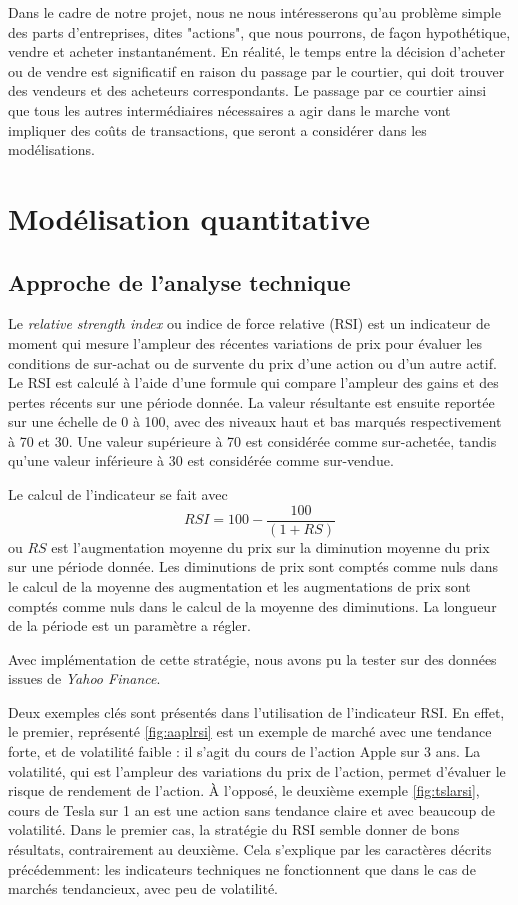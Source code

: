 \documentclass[twocolumn]{article}
\begin{document}
Dans le cadre de notre projet, nous ne nous intéresserons qu'au problème simple des parts d'entreprises, dites "actions", que nous pourrons, de façon hypothétique, vendre et acheter instantanément. En réalité, le temps entre la décision d'acheter ou de vendre est significatif en raison du passage par le courtier, qui doit trouver des vendeurs et des acheteurs correspondants. Le passage par ce courtier ainsi que tous les autres intermédiaires nécessaires a agir dans le marche vont impliquer des coûts de transactions, que seront a considérer dans les modélisations.

\section{Modélisation quantitative}

\subsection{Approche de l'analyse technique}

Le \textit{relative strength index} ou indice de force relative (RSI) est un indicateur de moment qui mesure l'ampleur des récentes variations de prix pour évaluer les conditions de sur-achat ou de survente du prix d'une action ou d'un autre actif. Le RSI est calculé à l'aide d'une formule qui compare l'ampleur des gains et des pertes récents sur une période donnée. La valeur résultante est ensuite reportée sur une échelle de 0 à 100, avec des niveaux haut et bas marqués respectivement à 70 et 30. Une valeur supérieure à 70 est considérée comme sur-achetée, tandis qu'une valeur inférieure à 30 est considérée comme sur-vendue.

Le calcul de l'indicateur se fait avec $$RSI = 100 - \frac{100}{(1 + RS)}$$
ou $RS$ est l'augmentation moyenne du prix sur la diminution moyenne du prix sur une période donnée. Les diminutions de prix sont compt\'es comme nuls dans le calcul de la moyenne des augmentation et les augmentations de prix sont compt\'es comme nuls dans le calcul de la moyenne des diminutions.
La longueur de la période est un paramètre a régler.

Avec implémentation de cette stratégie, nous avons pu la tester sur des données issues de \textit{Yahoo Finance}.

Deux exemples clés sont présentés dans l'utilisation de l'indicateur RSI. En effet, le premier, représenté \ref{fig:aaplrsi} est un exemple de marché avec une tendance forte, et de volatilité faible : il s'agit du cours de l'action Apple sur 3 ans. La volatilité, qui est l'ampleur des variations du prix de l'action, permet d'évaluer le risque de rendement de l'action. À l'opposé, le deuxième exemple \ref{fig:tslarsi}, cours de Tesla sur 1 an est une action sans tendance claire et avec beaucoup de volatilité. Dans le premier cas, la stratégie du RSI semble donner de bons résultats, contrairement au deuxième. Cela s'explique par les caractères décrits précédemment: les indicateurs techniques ne fonctionnent que dans le cas de marchés tendancieux, avec peu de volatilité.
\end{document}
